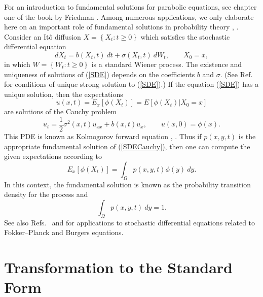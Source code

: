 \documentclass[12pt,reqno]{amsart}
\theoremstyle{plain}
\numberwithin{equation}{section}
\begin{document}
For an introduction to fundamental solutions for parabolic equations, see
chapter one of the book by Friedman \cite{Friedman64}. Among numerous
applications, we only elaborate here on an important role of fundamental
solutions in probability theory \cite{Craddock09}, \cite{KaratzShreve}.
Consider an It\^{o} diffusion $X=\left\{ X_{t}:t\geq 0\right\} $ which
satisfies the stochastic differential equation\begin{equation}
dX_{t}=b\left( X_{t},t\right) \ dt+\sigma \left( X_{t},t\right) \
dW_{t},\qquad X_{0}=x,  \label{SDE}
\end{equation}in which $W=\left\{ W_{t}:t\geq 0\right\} $ is a standard Wiener process.
The existence and uniqueness of solutions of (\ref{SDE}) depends on the
coefficients $b$ and $\sigma .$ (See Ref.~\cite{KaratzShreve} for conditions
of unique strong solution to (\ref{SDE}).) If the equation (\ref{SDE}) has a
unique solution, then the expectations\begin{equation}
u\left( x,t\right) =E_{x}\left[ \phi \left( X_{t}\right) \right] =E\left[
\phi \left( X_{t}\right) |X_{0}=x\right]  \label{Expect}
\end{equation}are solutions of the Cauchy problem\begin{equation}
u_{t}=\frac{1}{2}\sigma ^{2}\left( x,t\right) u_{xx}+b\left( x,t\right)
u_{x},\qquad u\left( x,0\right) =\phi \left( x\right) .  \label{SDECauchy}
\end{equation}This PDE is known as Kolmogorov forward equation \cite{Craddock09}, \cite{KaratzShreve}. Thus if $p\left( x,y,t\right) $ is the appropriate
fundamental solution of (\ref{SDECauchy}), then one can compute the given
expectations according to\begin{equation}
E_{x}\left[ \phi \left( X_{t}\right) \right] =\int_{\Omega }p\left(
x,y,t\right) \phi \left( y\right) \ dy.  \label{SDEExpect}
\end{equation}In this context, the fundamental solution is known as the probability
transition density for the process and\begin{equation}
\int_{\Omega }p\left( x,y,t\right) \ dy=1.  \label{norm}
\end{equation}See also Refs.~\cite{Albev:Roz10} and \cite{Kamb10} for applications to
stochastic differential equations related to Fokker--Planck and Burgers
equations.

\section{Transformation to the Standard Form}
\end{document}
